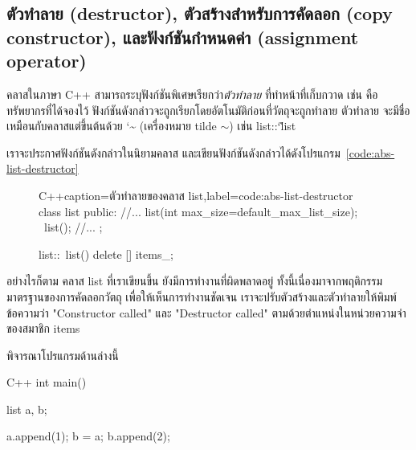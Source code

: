 \subsection{ตัว{\wbr}ทำลาย (destructor), ตัว{\wbr}สร้าง{\wbr}สำหรับ{\wbr}การ{\wbr}คัดลอก (copy constructor), และ{\wbr}ฟังก์ชัน{\wbr}กำหนด{\wbr}ค่า (assignment operator)}
ค{\wbr}ลา{\wbr}ส{\wbr}ใน{\wbr}ภาษา C++ สามารถ{\wbr}ระบุ{\wbr}ฟังก์ชัน{\wbr}พิเศษ{\wbr}เรียก{\wbr}ว่า{\em ตัว{\wbr}ทำลาย} ที่{\wbr}ทำ{\wbr}หน้าที่{\wbr}เก็บกวาด{\wbr}
เช่น คือ{\wbr}ทรัพยากร{\wbr}ที่{\wbr}ได้{\wbr}จอง{\wbr}ไว้ ฟังก์ชัน{\wbr}ดังกล่าว{\wbr}จะ{\wbr}ถูก{\wbr}เรียก{\wbr}โดย{\wbr}อัตโนมัติ{\wbr}ก่อน{\wbr}ที่{\wbr}วัตถุ{\wbr}จะ{\wbr}ถูก{\wbr}ทำลาย{\wbr}
ตัว{\wbr}ทำลาย จะ{\wbr}มี{\wbr}ชื่อ{\wbr}เหมือน{\wbr}กับ{\wbr}ค{\wbr}ลา{\wbr}ส{\wbr}แต่{\wbr}ขึ้นต้น{\wbr}ด้วย {\ct\char`\~} (เครื่องหมาย tilde
$\sim$) เช่น {\ct list::\char`\~list}

เรา{\wbr}จะ{\wbr}ประกาศ{\wbr}ฟังก์ชัน{\wbr}ดังกล่าว{\wbr}ใน{\wbr}นิยาม{\wbr}ค{\wbr}ลา{\wbr}ส
และ{\wbr}เขียน{\wbr}ฟังก์ชัน{\wbr}ดังกล่าว{\wbr}ได้{\wbr}ดัง{\wbr}โปรแกรม~\ref{code:abs-list-destructor}

\begin{figure}
\latintext
\begin{codelist}{C++}{caption={\thaitext ตัว{\wbr}ทำลาย{\wbr}ของ{\wbr}ค{\wbr}ลา{\wbr}ส {\ct list}\latintext},label=code:abs-list-destructor}
class list {
public:
  //...
  list(int max_size=default_max_list_size);
  ~list();
  //...
};

list::~list()
{
  delete [] items_;
}
\end{codelist}
\thaitext
\end{figure}

อย่างไรก็ตาม ค{\wbr}ลา{\wbr}ส {\ct list} ที่{\wbr}เรา{\wbr}เขียน{\wbr}ขึ้น ยัง{\wbr}มี{\wbr}การ{\wbr}ทำงาน{\wbr}ที่{\wbr}ผิดพลาด{\wbr}อยู่{\wbr}
ทั้งนี้{\wbr}เนื่องมาจาก{\wbr}พฤติกรรม{\wbr}มาตรฐาน{\wbr}ของ{\wbr}การ{\wbr}คัดลอก{\wbr}วัตถุ เพื่อให้{\wbr}เห็น{\wbr}การ{\wbr}ทำงาน{\wbr}ชัดเจน{\wbr}
เรา{\wbr}จะ{\wbr}ปรับ{\wbr}ตัว{\wbr}สร้าง{\wbr}และ{\wbr}ตัว{\wbr}ทำลาย{\wbr}ให้{\wbr}พิมพ์{\wbr}ข้อความ{\wbr}ว่า {\ct "Constructor called"} และ{\wbr}
{\ct "Destructor called"} ตาม{\wbr}ด้วย{\wbr}ตำแหน่ง{\wbr}ใน{\wbr}หน่วยความจำ{\wbr}ของ{\wbr}สมาชิก {\ct items}

พิจารณา{\wbr}โปรแกรม{\wbr}ด้าน{\wbr}ล่าง{\wbr}นี้{\wbr}
\latintext
\begin{codelist}{C++}{}
int main()
{
  list a, b;

  a.append(1);
  b = a;
  b.append(2);
}
\end{codelist}
\thaitext

